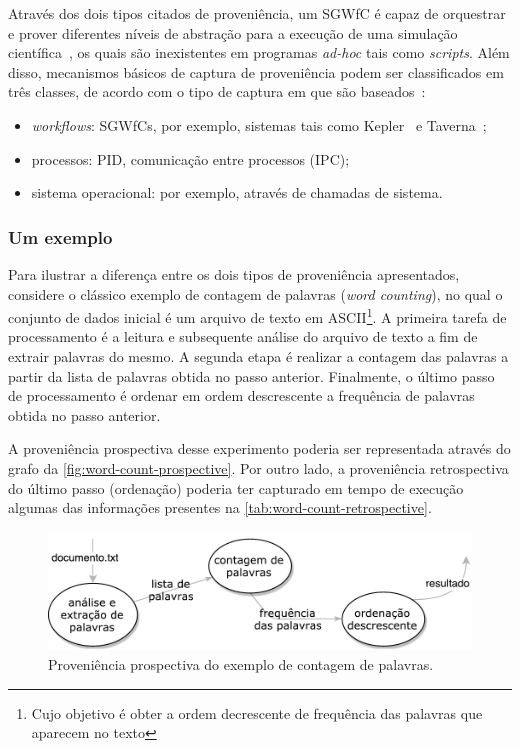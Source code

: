 Através dos dois tipos citados de proveniência, um SGWfC é capaz de orquestrar e prover diferentes níveis de abstração para a execução de uma simulação científica~\cite{murta2014noworkflow}, os quais são inexistentes em programas \textit{ad-hoc} tais como \textit{scripts}. Além disso, mecanismos básicos de captura de proveniência podem ser classificados em três classes, de acordo com o tipo de captura em que são baseados~\cite{freire2008provenance}:

\begin{itemize}
    \item \textit{workflows}: SGWfCs, por exemplo, sistemas tais como Kepler~\cite{ludascher2006scientific} e Taverna~\cite{hull2006taverna};
    \item processos: PID, comunicação entre processos (IPC);
    \item sistema operacional: por exemplo, através de chamadas de sistema.
\end{itemize}

\subsubsection{Um exemplo}

Para ilustrar a diferença entre os dois tipos de proveniência apresentados, considere o clássico exemplo de contagem de palavras (\textit{word counting}), no qual o conjunto de dados inicial é um arquivo de texto em  ASCII\footnote{Cujo objetivo é obter a ordem decrescente de frequência das palavras que aparecem no texto}. A primeira tarefa de processamento é a leitura e subsequente análise do arquivo de texto a fim de extrair palavras do mesmo. A segunda etapa é realizar a contagem das palavras a partir da lista de palavras obtida no passo anterior. Finalmente, o último passo de processamento é ordenar em ordem descrescente a frequência de palavras obtida no passo anterior.

A proveniência prospectiva desse experimento poderia ser representada através do grafo da \autoref{fig:word-count-prospective}. Por outro lado, a proveniência retrospectiva do último passo (ordenação) poderia ter capturado em tempo de execução algumas das informações presentes na \autoref{tab:word-count-retrospective}.

\begin{figure}[ht]
    \centering
    \includegraphics[width=\textwidth]{img/word-count-prospective}
    \caption[Proveniência prospectiva do exemplo de contagem de palavras]{Proveniência prospectiva do exemplo de contagem de palavras.}%
    \label{fig:word-count-prospective}
\end{figure}

